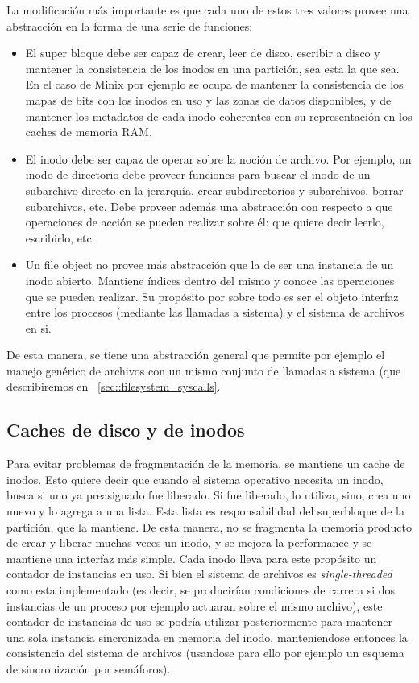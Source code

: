 La modificaci\'on m\'as importante es que cada uno de estos tres valores provee una abstracci\'on en la forma de una serie de funciones:

\begin{itemize}
	\item El super bloque debe ser capaz de crear, leer de disco, escribir a disco y mantener la consistencia de los inodos en una partici\'on,
	sea esta la que sea. En el caso de Minix por ejemplo se ocupa de mantener la consistencia de los mapas de bits con los inodos en uso y las
	zonas de datos disponibles, y de mantener los metadatos de cada inodo coherentes con su representaci\'on en los caches de memoria RAM.
	\item El inodo debe ser capaz de operar sobre la noci\'on de archivo. Por ejemplo, un inodo de directorio debe proveer funciones para
	buscar el inodo de un subarchivo directo en la jerarqu\'ia, crear subdirectorios y subarchivos, borrar subarchivos, etc. Debe proveer
	adem\'as una abstracci\'on con respecto a que operaciones de acci\'on se pueden realizar sobre \'el: que quiere decir leerlo, escribirlo,
	etc.
	\item Un file object no provee m\'as abstracci\'on que la de ser una instancia de un inodo abierto. Mantiene \'indices dentro del mismo y
	conoce las operaciones que se pueden realizar. Su prop\'osito por sobre todo es ser el objeto interfaz entre los procesos (mediante las
	llamadas a sistema) y el sistema de archivos en si.
\end{itemize}

De esta manera, se tiene una abstracci\'on general que permite por ejemplo el manejo gen\'erico de archivos con un mismo conjunto de llamadas
a sistema (que describiremos en ~\ref{sec::filesystem_syscalls}.

\subsection{Caches de disco y de inodos}

Para evitar problemas de fragmentaci\'on de la memoria, se mantiene un cache de inodos. Esto quiere decir que cuando el sistema operativo
necesita un inodo, busca si uno ya preasignado fue liberado. Si fue liberado, lo utiliza, sino, crea uno nuevo y lo agrega a una lista. Esta
lista es responsabilidad del superbloque de la partici\'on, que la mantiene. De esta manera, no se fragmenta la memoria producto de crear y
liberar muchas veces un inodo, y se mejora la performance y se mantiene una interfaz m\'as simple. Cada inodo lleva para este prop\'osito un
contador de instancias en uso. Si bien el sistema de archivos es \textit{single-threaded} como esta implementado (es decir, se producir\'ian
condiciones de carrera si dos instancias de un proceso por ejemplo actuaran sobre el mismo archivo), este contador de instancias de uso se
podr\'ia utilizar posteriormente para mantener una sola instancia sincronizada en memoria del inodo, manteniendose entonces la consistencia
del sistema de archivos (usandose para ello por ejemplo un esquema de sincronizaci\'on por sem\'aforos).

